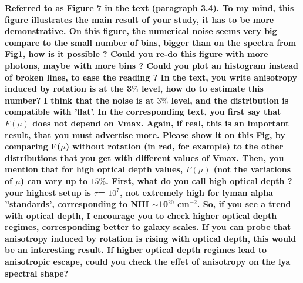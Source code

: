 \documentclass[12pt]{article}
\begin{document}
{\bf Referred to as Figure 7 in the text (paragraph 3.4). To my mind,
  this figure illustrates the main result of your study, it has to be
  more demonstrative. On this figure, the numerical noise seems very
  big compare to the small number of bins, bigger than on the spectra
  from Fig1, how is it possible ? Could you re-do this figure with
  more photons, maybe with more bins ? Could you plot an histogram
  instead of broken lines, to ease the reading ? In the text, you
  write anisotropy induced by rotation is at the 3$\%$ level, how do
  to estimate this number? I think that the noise is at $3\%$ level,
  and the distribution is compatible with ’flat’. In the corresponding
  text, you first say that $F(\mu)$ does not depend on Vmax. Again, if
  real, this is an important result, that you must advertise
  more. Please show it on this Fig, by comparing F($\mu$) without rotation
  (in red, for example) to the other distributions that you get with
  different values of Vmax. Then, you mention that for high optical
  depth values, $F(\mu)$ (not the variations of $\mu$) can vary up to
  $15\%$. First, what do you call high optical depth ? your highest
  setup is $\tau$= $10^7$, not extremely high for lyman alpha ”standards’,
  corresponding to NHI $\sim$10$^{20}$ cm$^{-2}$. So, if you see a trend with
  optical depth, I encourage you to check higher optical depth
  regimes, corresponding better to galaxy scales. If you can probe
  that anisotropy induced by rotation is rising with optical depth,
  this would be an interesting result. If higher optical depth regimes
  lead to anisotropic escape, could you check the effet of anisotropy
  on the lya spectral shape?} 
\end{document}
